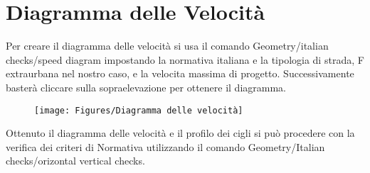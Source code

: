 \chapter{Diagramma delle Velocità}

Per creare il diagramma delle velocità si usa il comando Geometry/italian checks/speed diagram impostando la normativa italiana e la tipologia di strada, F extraurbana nel nostro caso, e la velocita massima di progetto. Successivamente basterà cliccare sulla sopraelevazione per ottenere il diagramma.

\begin{figure}[H]
	\centering
	\texttt{[image: Figures/Diagramma delle velocità]}
    \label{fig:Diagramma delle velocità}
\end{figure}

Ottenuto il diagramma delle velocità e il profilo dei cigli si può procedere con la verifica  dei criteri di Normativa utilizzando il comando Geometry/Italian checks/orizontal vertical checks.
